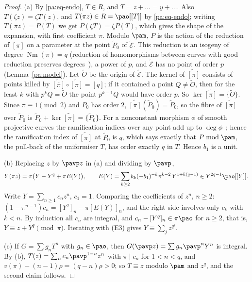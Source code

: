 \documentclass[10pt]{amsart}
\theoremstyle{definition}
\theoremstyle{remark}
\providecommand{\auNm}{\operatorname{Nm}}
\providecommand{\aubar}[1]{\overline{#1}}
\begin{document}
\begin{proof}
(a) By \eqref{pa:eq-endo}, $T\in R$, and $T=z+\dots=y+\dots$. Also $T(\zeta z)=\zeta T(z)$, and
$T(\pi z)\in R=\pao[[T]]$ by \eqref{pa:eq-endo}; writing $T(\pi z)=P(T)$ we get $P(\zeta T)=\zeta
P(T)$, which gives the shape of the expansion, with first coefficient $\pi$. Modulo $\pam$, $P$
is the action of the reduction of $[\pi]$ on a parameter at the point $\widetilde P_0$ of
$\widetilde{\mathcal E}$. This reduction is an isogeny of degree $\auNm(\pi)=q$ (reduction of homomorphisms between curves with good reduction preserves degrees~\cite[Chapter~II, Proposition~4.4]{SilvermanAT}), a power of $p$, and
$\widetilde{\mathcal E}$ has no point of order $p$ (Lemma~\ref{pa:model}). Let $\widetilde O$ be the origin of $\widetilde{\mathcal E}$. The kernel of
$\widetilde{[\pi]}$ consists of points killed by $\widetilde{[\aubar\pi]}\circ\widetilde{[\pi]}=[q]$;
if it contained a point $Q\ne\widetilde O$, then for the least $k$ with $p^kQ=\widetilde O$ the
point $p^{k-1}Q$ would have order $p$. So $\ker\widetilde{[\pi]}=\{\widetilde O\}$. Since
$\pi\equiv1\pmod2$ and $P_0$ has order $2$, $\widetilde{[\pi]}(\widetilde P_0)=\widetilde P_0$, so the
fibre of $\widetilde{[\pi]}$ over $\widetilde P_0$ is $\widetilde P_0+\ker\widetilde{[\pi]}=\{\widetilde P_0\}$. For a nonconstant morphism $\phi$ of smooth projective curves the
ramification indices over any point add up to $\deg\phi$~\cite[Chapter~II, Proposition~2.6(a)]{SilvermanAEC}; hence the
ramification index of $\widetilde{[\pi]}$ at $\widetilde P_0$ is $q$, which says exactly that
$P\bmod\pam$, the pull-back of the uniformiser $T$, has order exactly $q$ in $T$. Hence $b_1$ is a unit.

(b) Replacing $z$ by $\pavp z$ in (a) and dividing by $\pavp$,
\[
Y(\pi z)=\pi\bigl(Y-Y^q+\pi E(Y)\bigr),\qquad E(Y)=\sum_{k\ge2}b_k(-b_1)^{-k}\pi^{k-2}\,
Y^{1+k(q-1)}\in Y^{2q-1}\pao[[Y]].
\]
Write $Y=\sum_{n\ge1}c_nz^n$, $c_1=1$. Comparing the coefficients of $z^n$, $n\ge2$:
$(1-\pi^{n-1})c_n=[Y^q]_n-\pi[E(Y)]_n$, and the right side involves only $c_k$ with $k<n$. By
induction all $c_n$ are integral, and $c_n-[Y^q]_n\in\pi\pao$ for $n\ge2$, that is,
$Y\equiv z+Y^q\pmod\pi$. Iterating with (E3) gives $Y\equiv\sum_jz^{q^j}$.

(c) If $G=\sum g_nT^n$ with $g_n\in\pao$, then $G(\pavp z)=\sum g_n\pavp^nY^n$ is integral. By
(b), $T(z)=\sum_nc_n\pavp^{1-n}z^n$ with $\pi\mid c_n$ for $1<n<q$, and
$v(\pi)-(n-1)\rho=(q-n)\rho>0$; so $T\equiv z$ modulo $\pam$ and $z^q$, and the second claim
follows.
\end{proof}
\end{document}
